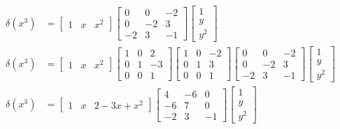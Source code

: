 \documentclass{standalone}
\begin{document}
\begin{align} \nonumber %
	\delta(x^3) &=
	\begin{bmatrix}
			1 & x & x^2
	\end{bmatrix}
	\begin{bmatrix}
		0 & 0 & -2 \\
		0 & -2 & 3 \\
		-2 & 3 & -1
	\end{bmatrix}
	\begin{bmatrix}
		1 \\
		y \\
		y^2
	\end{bmatrix} \\ \nonumber %
	\delta(x^3) &=
	\begin{bmatrix}
		1 & x & x^2
	\end{bmatrix}
	\begin{bmatrix}
		1 & 0 & 2 \\
		0 & 1 & -3 \\
		0 & 0 & 1
	\end{bmatrix}
	\begin{bmatrix}
		1 & 0 & -2 \\
		0 & 1 & 3 \\
		0 & 0 & 1
	\end{bmatrix}
	\begin{bmatrix}
		0 & 0 & -2 \\
		0 & -2 & 3 \\
		-2 & 3 & -1
	\end{bmatrix}
	\begin{bmatrix}
		1 \\
		y \\
		y^2
	\end{bmatrix} \\ \nonumber %
	\delta(x^3) &=
	\begin{bmatrix}
			1 & x & 2 - 3x + x^2
	\end{bmatrix}
	\begin{bmatrix}
		4 & -6 & 0 \\
		-6 & 7 & 0 \\
		-2 & 3 & -1
	\end{bmatrix}
	\begin{bmatrix}
		1 \\
		y \\
		y^2
	\end{bmatrix} \\ \nonumber %
\end{align}
\end{document}
